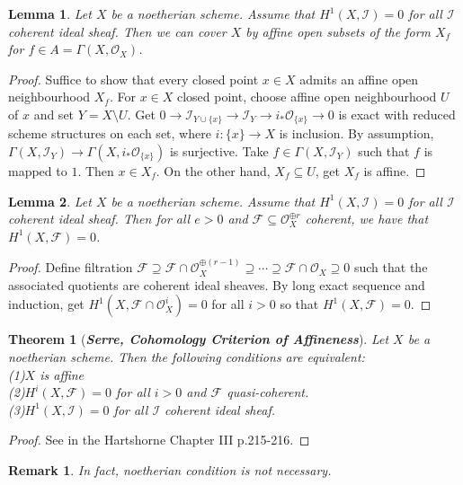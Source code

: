 \documentclass{ctexart}
\newtheorem{remark}{Remark}[section]
\newtheorem{theorem}{Theorem}[section]
\newtheorem{lemma}{Lemma}[section]
\begin{document}
\begin{lemma}
    Let $X$ be a noetherian scheme.
    Assume that $H^{1}(X, \mathcal{I}) = 0$ for all $\mathcal{I}$ coherent ideal sheaf.
    Then we can cover $X$ by affine open subsets of the form $X_{f}$ for $f\in A = \Gamma(X, \mathcal{O}_{X})$.
    \vspace{-\baselineskip} %
    \label{Lemma 7.3}
\end{lemma}
\begin{proof}
    Suffice to show that every closed point $x\in X$ admits an affine open neighbourhood $X_{f}$.
    For $x\in X$ closed point, choose affine open neighbourhood $U$ of $x$ and set $Y = X \setminus U$.
    Get $0 \longrightarrow \mathcal{I}_{Y \cup \{x\}} \longrightarrow \mathcal{I}_{Y} \longrightarrow i_{\ast}\mathcal{O}_{\{x\}} \longrightarrow 0$  is exact with reduced scheme structures on each set,
    where $i: \{x\} \longrightarrow X$ is inclusion.
    By assumption, $\Gamma(X, \mathcal{I}_{Y}) \longrightarrow \Gamma(X, i_{\ast}\mathcal{O}_{\{x\}})$ is surjective.
    Take $f\in \Gamma(X, \mathcal{I}_{Y})$ such that $f$ is mapped to $1$.
    Then $x\in X_{f}$.
    On the other hand, $X_{f} \subseteq U$, get $X_{f}$ is affine.
\end{proof}
\begin{lemma}
    Let $X$ be a noetherian scheme.
    Assume that $H^{1}(X, \mathcal{I}) = 0$ for all $\mathcal{I}$ coherent ideal sheaf.
    Then for all $e > 0$ and $\mathcal{F} \subseteq \mathcal{O}_{X}^{\oplus r}$ coherent, we have that $H^{1}(X, \mathcal{F}) = 0$.
    \label{Lemma 7.4}
\end{lemma}
\begin{proof}
    Define filtration $\mathcal{F} \supseteq \mathcal{F} \cap \mathcal{O}_{X}^{\oplus (r - 1)} \supseteq \cdots \supseteq \mathcal{F} \cap \mathcal{O}_{X} \supseteq 0$ such that the associated quotients are coherent ideal sheaves.
    By long exact sequence and induction, get $H^{1}(X, \mathcal{F} \cap \mathcal{O}_{X}^{i}) = 0$ for all $i > 0$ so that $H^{1}(X, \mathcal{F}) = 0$.
\end{proof}
\begin{theorem}[\textbf{\emph{Serre, Cohomology Criterion of Affineness}}]
    Let $X$ be a noetherian scheme.
    Then the following conditions are equivalent: \\
    (1)$X$ is affine \\
    (2)$H^{i}(X, \mathcal{F}) = 0$ for all $i > 0$ and $\mathcal{F}$ quasi-coherent. \\
    (3)$H^{1}(X, \mathcal{I}) = 0$ for all $\mathcal{I}$ coherent ideal sheaf.
    \label{Theorem 7.4}
\end{theorem}
\begin{proof}
    See in the Hartshorne Chapter III p.215-216.
\end{proof}
\begin{remark}
    In fact, noetherian condition is not necessary.
\end{remark}
\end{document}

